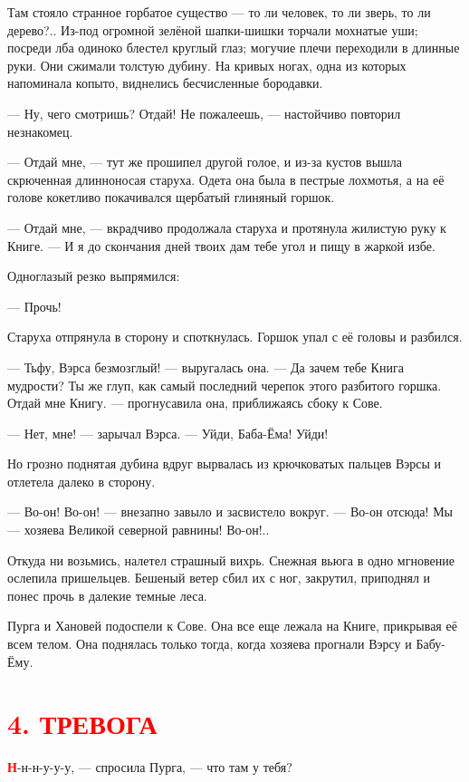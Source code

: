 \documentclass[12pt, a4paper, openany]{book}
\begin{document}
	Там стояло странное горбатое существо — то ли человек, то ли зверь, то ли дерево?.. Из-под огромной зелёной шапки-шишки торчали мохнатые уши; посреди лба одиноко блестел круглый глаз; могучие плечи переходили в длинные руки. Они сжимали толстую дубину. На кривых ногах, одна из которых напоминала копыто, виднелись бесчисленные бородавки.
	
	— Ну, чего смотришь? Отдай! Не пожалеешь, — настойчиво повторил незнакомец.
	
	— Отдай мне, — тут же прошипел другой голое, и из-за кустов вышла скрюченная длинноносая старуха. Одета она была в пестрые лохмотья, а на её голове кокетливо покачивался щербатый глиняный горшок.
	
	— Отдай мне, — вкрадчиво продолжала старуха и протянула жилистую руку к Книге. — И я до скончания дней твоих дам тебе угол и пищу в жаркой избе.
	
	Одноглазый резко выпрямился:
	
	— Прочь!
	
	Старуха отпрянула в сторону и споткнулась. Горшок упал с её головы и разбился.
	
	— Тьфу, Вэрса безмозглый! — выругалась она. — Да зачем тебе Книга мудрости? Ты же глуп, как самый последний черепок этого разбитого горшка. Отдай мне Книгу. — прогнусавила она, приближаясь сбоку к Сове.
	
	— Нет, мне! — зарычал Вэрса. — Уйди, Баба-Ёма! Уйди!
	
	Но грозно поднятая дубина вдруг вырвалась из крючковатых пальцев Вэрсы и отлетела далеко в сторону.
	
	— Во-он! Во-он! — внезапно завыло и засвистело вокруг. — Во-он отсюда! Мы — хозяева Великой северной равнины! Во-он!..
	
	Откуда ни возьмись, налетел страшный вихрь. Снежная вьюга в одно мгновение ослепила пришельцев. Бешеный ветер сбил их с ног, закрутил, приподнял и понес прочь в далекие темные леса.
	
	Пурга и Хановей подоспели к Сове. Она все еще лежала на Книге, прикрывая её всем телом. Она поднялась только тогда, когда хозяева прогнали Вэрсу и Бабу-Ёму.
	
		\section[4. Тревога]{\center \textcolor{red}{4. ТРЕВОГА}}
	
	\lettrine[findent=0pt]{\textbf{\textcolor{red}{Н}}}{}-н-н-у-у-у, — спросила Пурга, — что там у тебя?
	
\end{document}
